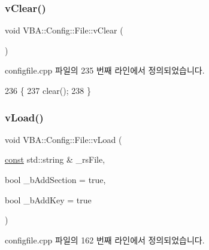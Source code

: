 \mbox{\label{class_v_b_a_1_1_config_1_1_file_aab1ab602f9eafb2ea1cd981a2953756d}} 
\subsubsection{\texorpdfstring{v\+Clear()}{vClear()}}
{\footnotesize\ttfamily void V\+B\+A\+::\+Config\+::\+File\+::v\+Clear (\begin{DoxyParamCaption}{ }\end{DoxyParamCaption})}



configfile.\+cpp 파일의 235 번째 라인에서 정의되었습니다.


\begin{DoxyCode}
236 \{
237   clear();
238 \}
\end{DoxyCode}
\mbox{\label{class_v_b_a_1_1_config_1_1_file_ac70f83e5efe3c2d7a66de7227099803b}} 
\subsubsection{\texorpdfstring{v\+Load()}{vLoad()}}
{\footnotesize\ttfamily void V\+B\+A\+::\+Config\+::\+File\+::v\+Load (\begin{DoxyParamCaption}\item[{\mbox{\hyperlink{getopt1_8c_a2c212835823e3c54a8ab6d95c652660e}{const}} std\+::string \&}]{\+\_\+rs\+File,  }\item[{bool}]{\+\_\+b\+Add\+Section = {\ttfamily true},  }\item[{bool}]{\+\_\+b\+Add\+Key = {\ttfamily true} }\end{DoxyParamCaption})}



configfile.\+cpp 파일의 162 번째 라인에서 정의되었습니다.


